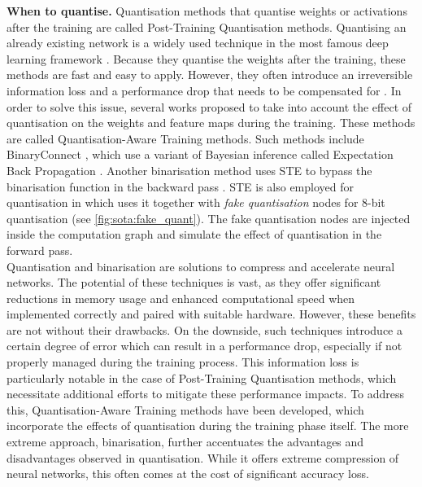 \noindent\textbf{When to quantise.} Quantisation methods that quantise weights
or activations after the training are called Post-Training Quantisation methods.
Quantising an already existing network is a widely used technique in the most
famous deep learning framework \cite{ncnn,qnnpack,snapdragon,tensorrt}. Because
they quantise the weights after the training, these methods are fast and easy to
apply. However, they often introduce an irreversible information loss and a
performance drop that needs to be compensated for
\cite{DBLP:journals/ijon/LiangGWSZ21}. In order to solve this issue, several
works proposed to take into account the effect of quantisation on the weights
and feature maps during the training. These methods are called
Quantisation-Aware Training methods. Such methods include BinaryConnect
\cite{courbariaux2015binaryconnect}, which use a variant of Bayesian inference
called Expectation Back Propagation
\cite{DBLP:journals/corr/ChengSML15,DBLP:conf/nips/SoudryHM14}. Another
binarisation method uses \ac{STE} \cite{DBLP:journals/corr/BengioLC13} to bypass
the binarisation function in the backward pass
\cite{DBLP:conf/nips/HubaraCSEB16}. \ac{STE} is also employed for quantisation
in \cite{DBLP:conf/cvpr/JacobKCZTHAK18} which uses it together with \emph{fake
quantisation} nodes for 8-bit quantisation (see \cref{fig:sota:fake_quant}). The
fake quantisation nodes are injected inside the computation graph and simulate
the effect of quantisation in the forward pass.\\

Quantisation and binarisation are solutions to compress and accelerate neural
networks. The potential of these techniques is vast, as they offer significant
reductions in memory usage and enhanced computational speed when implemented
correctly and paired with suitable hardware. However, these benefits are not
without their drawbacks. On the downside, such techniques introduce a certain
degree of error which can result in a performance drop, especially if not
properly managed during the training process. This information loss is
particularly notable in the case of Post-Training Quantisation methods, which
necessitate additional efforts to mitigate these performance impacts. To address
this, Quantisation-Aware Training methods have been developed, which incorporate
the effects of quantisation during the training phase itself. The more extreme
approach, binarisation, further accentuates the advantages and disadvantages
observed in quantisation. While it offers extreme compression of neural
networks, this often comes at the cost of significant accuracy loss.\\


